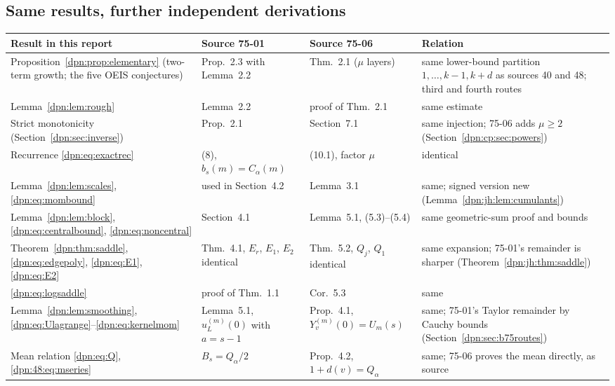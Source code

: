\documentclass[11pt]{article}
\numberwithin{equation}{section}
\theoremstyle{definition}\newtheorem{definition}[theorem]{Definition}
\theoremstyle{remark}\newtheorem{remark}[theorem]{Remark}
\begin{document}
\subsection{Same results, further independent derivations}\label{dpn:sec:b75dup}
\begin{table}[!htbp]
\centering\small
\begin{tabular}{>{\raggedright\arraybackslash}p{3.5cm}>{\raggedright\arraybackslash}p{3.0cm}>{\raggedright\arraybackslash}p{3.0cm}>{\raggedright\arraybackslash}p{3.8cm}}
\toprule
Result in this report & Source 75-01 & Source 75-06 & Relation\\
\midrule
Proposition~\ref{dpn:prop:elementary} (two-term growth; the five OEIS conjectures) &
 Prop.~2.3 with Lemma~2.2 & Thm.~2.1 ($\mu$ layers) &
 same lower-bound partition $1,\dots,k-1,k+d$ as sources 40 and 48; third and
 fourth routes\\
Lemma~\ref{dpn:lem:rough} & Lemma~2.2 & proof of Thm.~2.1 & same estimate\\
Strict monotonicity (Section~\ref{dpn:sec:inverse}) & Prop.~2.1 & Section~7.1 &
 same injection; 75-06 adds $\mu\ge2$ (Section~\ref{dpn:cp:sec:powers})\\
Recurrence \eqref{dpn:eq:exactrec} & (8), $b_s(m)=C_\alpha(m)$ &
 (10.1), factor $\mu$ & identical\\
Lemma~\ref{dpn:lem:scales}, \eqref{dpn:eq:mombound} & used in Section~4.2 &
 Lemma~3.1 & same; signed version new (Lemma~\ref{dpn:jh:lem:cumulants})\\
Lemma~\ref{dpn:lem:block}, \eqref{dpn:eq:centralbound},
 \eqref{dpn:eq:noncentral} & Section~4.1 & Lemma~5.1, (5.3)--(5.4) &
 same geometric-sum proof and bounds\\
Theorem~\ref{dpn:thm:saddle}, \eqref{dpn:eq:edgepoly}, \eqref{dpn:eq:E1},
 \eqref{dpn:eq:E2} & Thm.~4.1, $E_r$, $E_1$, $E_2$ identical &
 Thm.~5.2, $Q_j$, $Q_1$ identical & same expansion; 75-01's remainder is
 sharper (Theorem~\ref{dpn:jh:thm:saddle})\\
\eqref{dpn:eq:logsaddle} & proof of Thm.~1.1 & Cor.~5.3 & same\\
Lemma~\ref{dpn:lem:smoothing}, \eqref{dpn:eq:Ulagrange}--\eqref{dpn:eq:kernelmom} &
 Lemma~5.1, $u_L^{(m)}(0)$ with $a=s-1$ & Prop.~4.1, $Y_v^{(m)}(0)=U_m(s)$ &
 same; 75-01's Taylor remainder by Cauchy bounds
 (Section~\ref{dpn:sec:b75routes})\\
Mean relation \eqref{dpn:eq:Q}, \eqref{dpn:48:eq:mseries} & $B_s=Q_\alpha/2$ &
 Prop.~4.2, $1+d(v)=Q_\alpha$ & same; 75-06 proves the mean directly, as source

\end{tabular}
\end{table}
\end{document}
